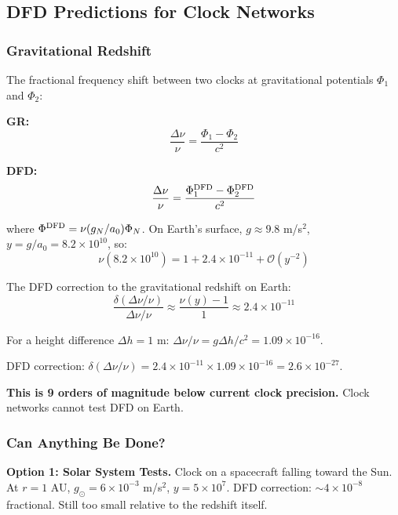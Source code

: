 \documentclass[11pt,a4paper]{article}
\begin{document}
\subsection{DFD Predictions for Clock Networks}

\subsubsection{Gravitational Redshift}

The fractional frequency shift between two clocks at gravitational potentials $\Phi_1$ and $\Phi_2$:

\textbf{GR:}
\begin{equation}
\frac{\Delta\nu}{\nu} = \frac{\Phi_1 - \Phi_2}{c^2}
\end{equation}

\textbf{DFD:}
\begin{equation}
\frac{\Delta\nu}{\nu} = \frac{\Phi_1^{\rm DFD} - \Phi_2^{\rm DFD}}{c^2}
\end{equation}

where $\Phi^{\rm DFD} = \nu(g_N/a_0)\Phi_N$. On Earth's surface, $g \approx 9.8$ m/s$^2$, $y = g/a_0 = 8.2\times10^{10}$, so:
\begin{equation}
\nu(8.2\times10^{10}) = 1 + 2.4\times10^{-11} + \mathcal{O}(y^{-2})
\end{equation}

The DFD correction to the gravitational redshift on Earth:
\begin{equation}
\frac{\delta(\Delta\nu/\nu)}{\Delta\nu/\nu} \approx \frac{\nu(y) - 1}{1} \approx 2.4\times10^{-11}
\end{equation}

For a height difference $\Delta h = 1$ m: $\Delta\nu/\nu = g\Delta h/c^2 = 1.09\times10^{-16}$.

DFD correction: $\delta(\Delta\nu/\nu) = 2.4\times10^{-11}\times1.09\times10^{-16} = 2.6\times10^{-27}$.

\textbf{This is 9 orders of magnitude below current clock precision.} Clock networks cannot test DFD on Earth.

\subsubsection{Can Anything Be Done?}

\textbf{Option 1: Solar System Tests.}
Clock on a spacecraft falling toward the Sun. At $r = 1$ AU, $g_\odot = 6\times10^{-3}$ m/s$^2$, $y = 5\times10^7$. DFD correction: $\sim 4\times10^{-8}$ fractional. Still too small relative to the redshift itself.
\end{document}

